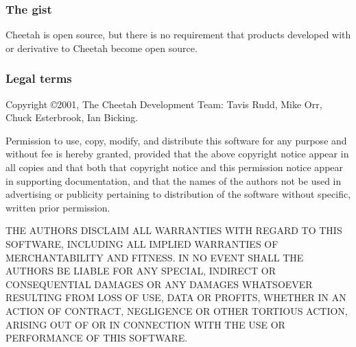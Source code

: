 \subsubsection{The gist}
Cheetah is open source, but there is no requirement that products developed with
or derivative to Cheetah become open source.

\subsubsection{Legal terms}
Copyright \copyright 2001, The Cheetah Development Team: Tavis Rudd, Mike Orr,
Chuck Esterbrook, Ian Bicking.

Permission to use, copy, modify, and distribute this software for any purpose
and without fee is hereby granted, provided that the above copyright notice
appear in all copies and that both that copyright notice and this permission
notice appear in supporting documentation, and that the names of the authors not
be used in advertising or publicity pertaining to distribution of the software
without specific, written prior permission.

THE AUTHORS DISCLAIM ALL WARRANTIES WITH REGARD TO THIS SOFTWARE, INCLUDING ALL
IMPLIED WARRANTIES OF MERCHANTABILITY AND FITNESS. IN NO EVENT SHALL THE AUTHORS
BE LIABLE FOR ANY SPECIAL, INDIRECT OR CONSEQUENTIAL DAMAGES OR ANY DAMAGES
WHATSOEVER RESULTING FROM LOSS OF USE, DATA OR PROFITS, WHETHER IN AN ACTION OF
CONTRACT, NEGLIGENCE OR OTHER TORTIOUS ACTION, ARISING OUT OF OR IN CONNECTION
WITH THE USE OR PERFORMANCE OF THIS SOFTWARE.

